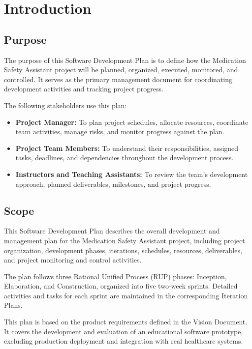\section{Introduction}

\subsection{Purpose}

The purpose of this Software Development Plan is to define how the
Medication Safety Assistant project will be planned, organized,
executed, monitored, and controlled. It serves as the primary
management document for coordinating development activities and
tracking project progress.

The following stakeholders use this plan:
\begin{itemize}
    \item \textbf{Project Manager:} To plan project schedules,
    allocate resources, coordinate team activities, manage risks,
    and monitor progress against the plan.

    \item \textbf{Project Team Members:} To understand their
    responsibilities, assigned tasks, deadlines, and dependencies
    throughout the development process.

    \item \textbf{Instructors and Teaching Assistants:} To review
    the team's development approach, planned deliverables,
    milestones, and project progress.
\end{itemize}

\subsection{Scope}

This Software Development Plan describes the overall development
and management plan for the Medication Safety Assistant project,
including project organization, development phases, iterations,
schedules, resources, deliverables, and project monitoring and
control activities.

The plan follows three Rational Unified Process (RUP) phases:
Inception, Elaboration, and Construction, organized into five
two-week sprints. Detailed activities and tasks for each sprint
are maintained in the corresponding Iteration Plans.

This plan is based on the product requirements defined in the
Vision Document. It covers the development and evaluation of
an educational software prototype, excluding production deployment
and integration with real healthcare systems.

